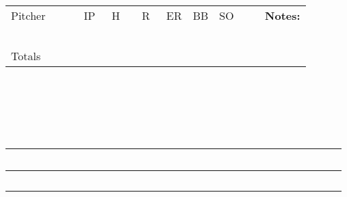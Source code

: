 \begin{tabular}{||l|r|r|r|r|r|r||r} \cline{1- 7} \cline{1- 7}
Pitcher~~~~~ & IP & ~H~ & ~R~ & ER & BB & SO &~~~{\bf\normalsize
                                                   Notes:} \\ \cline{1- 7}
 & & & & & & & \\  \cline{1- 7}
 & & & & & & & \\  \cline{1- 7}
 & & & & & & & \\  \cline{1- 7}
 & & & & & & & \\  \cline{1- 7}
 & & & & & & & \\  \cline{1- 7} \cline{2- 7}
Totals & & & & & & & \\  \cline{1- 7} \cline{2- 7}
\end{tabular}  \\
\normalsize

\medskip

     \\
\medskip

     \\
\medskip

\LARGE
\bigskip
\bigskip

\begin{tabular}{||l||r|r|r|r|r|r|r|r|r||r|r|r|r||}      \hline\hline
~~~~~~~~~~~~~~~~&~ &~ &~ &~ &~ &~ &~ &~ &~ &~ &~ &~ &~ \\ \hline
~~~~~~~~~~~~~~~~&~ &~ &~ &~ &~ &~ &~ &~ &~ &~ &~ &~ &~ \\ \hline\hline
\end{tabular}   \\

